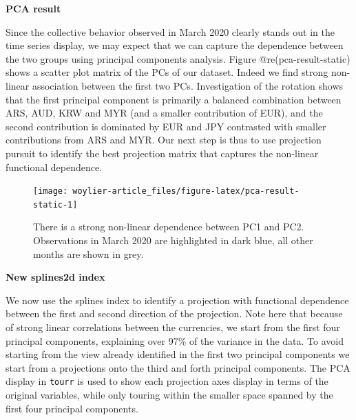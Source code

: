 \textbf{PCA result}

Since the collective behavior observed in March 2020 clearly stands out in the time series display, we may expect that we can capture the dependence between the two groups using principal components analysis. Figure @re(pca-result-static)
shows a scatter plot matrix of the PCs of our dataset. Indeed we find strong non-linear association between the first two PCs. Investigation of the rotation shows that the first principal component is primarily a balanced combination between ARS, AUD, KRW and MYR (and a smaller contribution of EUR), and the second contribution is dominated by EUR and JPY contrasted with smaller contributions from ARS and MYR. Our next step is thus to use projection pursuit to identify the best projection matrix that captures the non-linear functional dependence.

\begin{figure}

{\centering \texttt{[image: woylier-article\_files/figure-latex/pca-result-static-1]} 

}

\caption{There is a strong non-linear dependence between PC1 and PC2. Observations in March 2020 are highlighted in dark blue, all other months are shown in grey.}\label{fig:pca-result-static}
\end{figure}

\textbf{New splines2d index}

We now use the splines index to identify a projection with functional dependence between the first and second direction of the projection. Note here that because of strong linear correlations between the currencies, we start from the first four principal components, explaining over 97\% of the variance in the data. To avoid starting from the view already identified in the first two principal components we start from a projections onto the third and forth principal components. The PCA display in \texttt{tourr} is used to show each projection axes display in terms of the original variables, while only touring within the smaller space spanned by the first four principal components.

